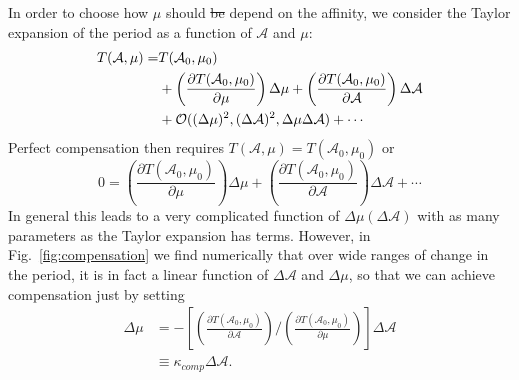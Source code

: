 \documentclass[amsmath, preprintnumbers, 10pt, twocolumn, pre, bibliograpy]{revtex4-1}
\newcommand{\aff}{\mathcal A}
\providecommand{\DIFdel}[1]{{\protect\color{red}\sout{#1}}}                      %
\providecommand{\DIFdelbegin}{} %
\providecommand{\DIFdelend}{} %
\newcommand{\DIFscaledelfig}{0.5}
\newlength{\DIFdelgraphicswidth} %
\newlength{\DIFdelgraphicsheight} %
\newcommand{\DIFdelincludegraphics}[2][]{%
\sbox{\DIFdelgraphicsbox}{\DIFOincludegraphics[#1]{#2}}%
\settoboxwidth{\DIFdelgraphicswidth}{\DIFdelgraphicsbox} %
\settoboxtotalheight{\DIFdelgraphicsheight}{\DIFdelgraphicsbox} %
\scalebox{\DIFscaledelfig}{%
\parbox[b]{\DIFdelgraphicswidth}{\usebox{\DIFdelgraphicsbox}\\[-\baselineskip] \rule{\DIFdelgraphicswidth}{0em}}\llap{\resizebox{\DIFdelgraphicswidth}{\DIFdelgraphicsheight}{%
\setlength{\unitlength}{\DIFdelgraphicswidth}%
\begin{picture}(1,1)%
\thicklines\linethickness{2pt} %
{\color[rgb]{1,0,0}\put(0,0){\framebox(1,1){}}}%
{\color[rgb]{1,0,0}\put(0,0){\line( 1,1){1}}}%
{\color[rgb]{1,0,0}\put(0,1){\line(1,-1){1}}}%
\end{picture}%
}\hspace*{3pt}}} %
} %
\DeclareRobustCommand{\DIFdelbegin}{\DIFOdelbegin \let\includegraphics\DIFdelincludegraphics} %
\DeclareRobustCommand{\DIFdelend}{\DIFOaddend \let\includegraphics\DIFOincludegraphics} %
\begin{document}
In order to choose how $\mu$ should \DIFdelbegin \DIFdel{be }\DIFdelend depend on the affinity, we consider the Taylor expansion of the period as a function of $\aff$ and $\mu$:
\begin{align}
T(\aff, \mu) = &T(\aff_0, \mu_0)  \\
&+  \left(\frac{\partial T(\aff_0, \mu_0) }{\partial \mu}\right) \Delta\mu +  \left(\frac{\partial T(\aff_0, \mu_0) }{\partial \aff}\right) \Delta\aff \notag \\
& + \mathcal O((\Delta\mu)^2, (\Delta\aff)^2, \Delta\mu\Delta\aff) + \cdots \notag
\label{eq:texpand}
\end{align}
Perfect compensation then requires $T(\aff, \mu) = T(\aff_0, \mu_0)$ or 
\begin{equation}
0 =  \left(\frac{\partial T(\aff_0, \mu_0) }{\partial \mu}\right) \Delta\mu +  \left(\frac{\partial T(\aff_0, \mu_0) }{\partial \aff}\right) \Delta\aff + \cdots
\label{eq:texpand}
\end{equation}
In general this leads to a very complicated function of $\Delta\mu(\Delta\aff)$ with as many parameters as the Taylor expansion has terms. However, in Fig.~\ref{fig:compensation} we find numerically that over wide ranges of change in the period, it is in fact a linear function of $\Delta\aff$ and $\Delta\mu$, so that we can achieve compensation just by setting 
\begin{align}
\Delta\mu &= - \left[\left(\frac{\partial T(\aff_0, \mu_0) }{\partial \aff}\right)\bigg/\left(\frac{\partial T(\aff_0, \mu_0) }{\partial \mu}\right) \right]\Delta\aff\\
 &\equiv \kappa_{comp} \Delta\aff.
\end{align}
\end{document}
